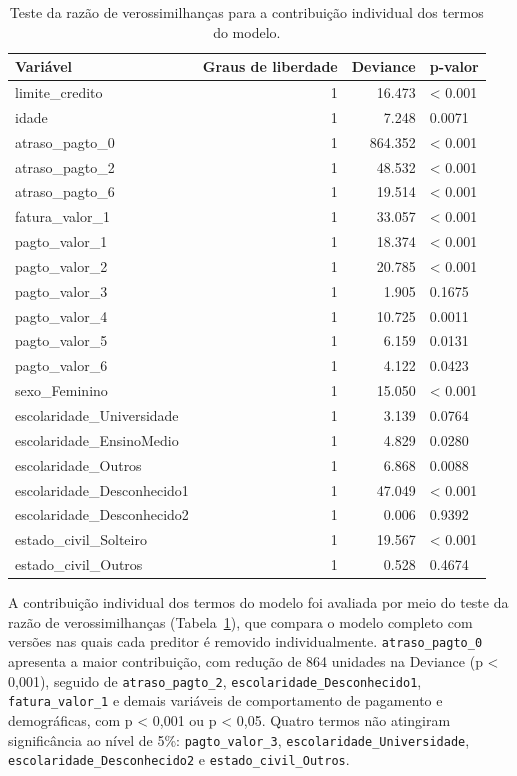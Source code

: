 \documentclass[
  brazilian,
  12pt,
  letterpaper,
  DIV=11,
  numbers=noendperiod]{scrartcl}
\begin{document}
{

\begin{longtable}[]{@{}lrrl@{}}

\caption{\label{tbl-drop1-pd30}Teste da razão de verossimilhanças para a
contribuição individual dos termos do modelo.}

\tabularnewline

\toprule\noalign{}
Variável & Graus de liberdade & Deviance & p-valor \\
\midrule\noalign{}
\endhead
\bottomrule\noalign{}
\endlastfoot
limite\_credito & 1 & 16.473 & \textless{} 0.001 \\
idade & 1 & 7.248 & 0.0071 \\
atraso\_pagto\_0 & 1 & 864.352 & \textless{} 0.001 \\
atraso\_pagto\_2 & 1 & 48.532 & \textless{} 0.001 \\
atraso\_pagto\_6 & 1 & 19.514 & \textless{} 0.001 \\
fatura\_valor\_1 & 1 & 33.057 & \textless{} 0.001 \\
pagto\_valor\_1 & 1 & 18.374 & \textless{} 0.001 \\
pagto\_valor\_2 & 1 & 20.785 & \textless{} 0.001 \\
pagto\_valor\_3 & 1 & 1.905 & 0.1675 \\
pagto\_valor\_4 & 1 & 10.725 & 0.0011 \\
pagto\_valor\_5 & 1 & 6.159 & 0.0131 \\
pagto\_valor\_6 & 1 & 4.122 & 0.0423 \\
sexo\_Feminino & 1 & 15.050 & \textless{} 0.001 \\
escolaridade\_Universidade & 1 & 3.139 & 0.0764 \\
escolaridade\_EnsinoMedio & 1 & 4.829 & 0.0280 \\
escolaridade\_Outros & 1 & 6.868 & 0.0088 \\
escolaridade\_Desconhecido1 & 1 & 47.049 & \textless{} 0.001 \\
escolaridade\_Desconhecido2 & 1 & 0.006 & 0.9392 \\
estado\_civil\_Solteiro & 1 & 19.567 & \textless{} 0.001 \\
estado\_civil\_Outros & 1 & 0.528 & 0.4674 \\

\end{longtable}

}

A contribuição individual dos termos do modelo foi avaliada por meio do
teste da razão de verossimilhanças (Tabela~\ref{tbl-drop1-pd30}), que
compara o modelo completo com versões nas quais cada preditor é removido
individualmente. \texttt{atraso\_pagto\_0} apresenta a maior
contribuição, com redução de 864 unidades na Deviance (p \textless{}
0,001), seguido de \texttt{atraso\_pagto\_2},
\texttt{escolaridade\_Desconhecido1}, \texttt{fatura\_valor\_1} e demais
variáveis de comportamento de pagamento e demográficas, com p
\textless{} 0,001 ou p \textless{} 0,05. Quatro termos não atingiram
significância ao nível de 5\%: \texttt{pagto\_valor\_3},
\texttt{escolaridade\_Universidade},
\texttt{escolaridade\_Desconhecido2} e \texttt{estado\_civil\_Outros}.
\end{document}
